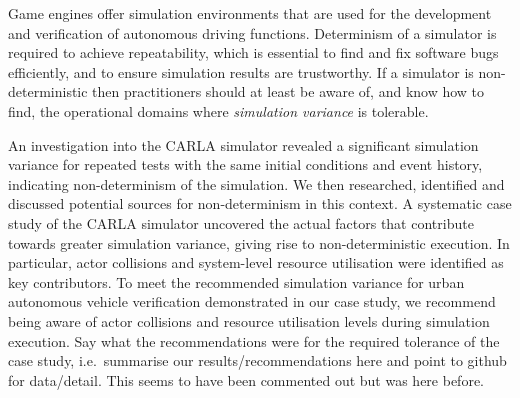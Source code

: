 \documentclass[letterpaper, 10 pt, journal, twoside]{IEEEtran}
\begin{document}

Game engines offer simulation environments that are used for the development and verification of autonomous driving functions. 
%
Determinism of a simulator is required to achieve repeatability, which is essential to find and fix software bugs efficiently, and to ensure simulation results are trustworthy. 
%
If a simulator is non-deterministic then practitioners should at least be aware of, and know how to find, the operational domains where \textit{simulation variance} is tolerable. 

An investigation into the CARLA simulator revealed a significant simulation variance for repeated tests with the same initial conditions and event history, indicating non-determinism of the simulation. 
%
We then researched, identified and discussed potential sources for non-determinism in this context.
%
A systematic case study of the CARLA simulator uncovered the actual factors that contribute towards greater simulation variance, giving rise to non-deterministic execution. In particular, actor collisions and system-level resource utilisation were identified as key contributors. 
%
{\color{green} To meet the recommended simulation variance for urban autonomous vehicle verification demonstrated in our case study, we recommend being aware of actor collisions and resource utilisation levels during simulation execution.  }
%
{\color{red} \sc Say what the recommendations were for the required tolerance of the case study, i.e.\ summarise our results/recommendations here and point to github for data/detail. This seems to have been commented out but was here before.}
\end{document}
